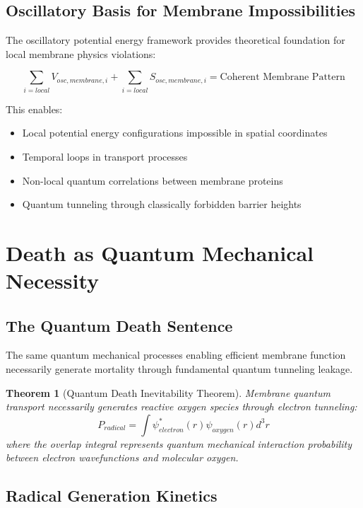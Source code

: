 \documentclass[12pt,a4paper]{article}
\newtheorem{theorem}{Theorem}
\begin{document}
\subsection{Oscillatory Basis for Membrane Impossibilities}

The oscillatory potential energy framework provides theoretical foundation for local membrane physics violations:

\begin{equation}
\sum_{i=local} V_{osc,membrane,i} + \sum_{i=local} S_{osc,membrane,i} = \text{Coherent Membrane Pattern}
\end{equation}

This enables:
\begin{itemize}
\item Local potential energy configurations impossible in spatial coordinates
\item Temporal loops in transport processes
\item Non-local quantum correlations between membrane proteins
\item Quantum tunneling through classically forbidden barrier heights
\end{itemize}

\section{Death as Quantum Mechanical Necessity}

\subsection{The Quantum Death Sentence}

The same quantum mechanical processes enabling efficient membrane function necessarily generate mortality through fundamental quantum tunneling leakage.

\begin{theorem}[Quantum Death Inevitability Theorem]
Membrane quantum transport necessarily generates reactive oxygen species through electron tunneling:
\begin{equation}
P_{radical} = \int \psi_{electron}^*(r) \psi_{oxygen}(r) d^3r
\end{equation}
where the overlap integral represents quantum mechanical interaction probability between electron wavefunctions and molecular oxygen.
\end{theorem}

\subsection{Radical Generation Kinetics}
\end{document}
